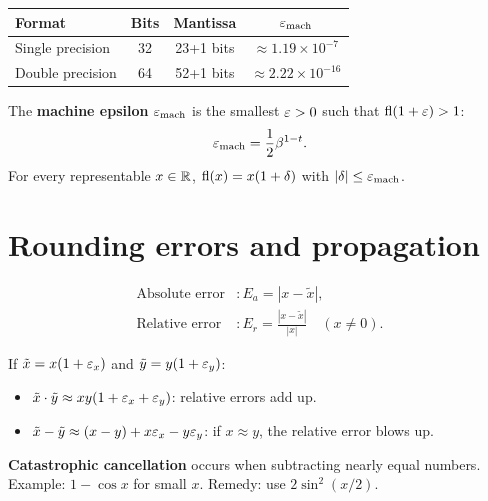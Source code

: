 \begin{definition}
\begin{center}
\begin{tabular}{lccc}
\toprule
\textbf{Format} & \textbf{Bits} & \textbf{Mantissa} & \textbf{$\varepsilon_{\mathrm{mach}}$} \\
\midrule
Single precision & 32 & 23+1 bits & $\approx 1.19\times 10^{-7}$ \\
Double precision & 64 & 52+1 bits & $\approx 2.22\times 10^{-16}$ \\
\bottomrule
\end{tabular}
\end{center}
\end{definition}

\begin{definition}
The \textbf{machine epsilon} $\varepsilon_{\mathrm{mach}}$ is the smallest $\varepsilon>0$ such that $\mathrm{fl}(1+\varepsilon)>1$:
\[
\varepsilon_{\mathrm{mach}} = \frac{1}{2}\beta^{1-t}.
\]
For every representable $x\in\mathbb{R}$, $\mathrm{fl}(x)=x(1+\delta)$ with $|\delta|\leq\varepsilon_{\mathrm{mach}}$.
\end{definition}

\section{Rounding errors and propagation}

\begin{definition}
\begin{align}
\text{Absolute error} &: E_a = |x-\tilde{x}|, \\
\text{Relative error} &: E_r = \frac{|x-\tilde{x}|}{|x|} \quad (x\neq 0).
\end{align}
\end{definition}

\begin{theorem}
If $\tilde{x}=x(1+\varepsilon_x)$ and $\tilde{y}=y(1+\varepsilon_y)$:
\begin{itemize}
\item $\tilde{x}\cdot\tilde{y}\approx xy(1+\varepsilon_x+\varepsilon_y)$: relative errors add up.
\item $\tilde{x}-\tilde{y}\approx(x-y)+x\varepsilon_x-y\varepsilon_y$: if $x\approx y$, the relative error blows up.
\end{itemize}
\end{theorem}

\begin{warning}
\textbf{Catastrophic cancellation} occurs when subtracting nearly equal numbers. Example: $1-\cos x$ for small $x$. Remedy: use $2\sin^2(x/2)$.
\end{warning}

